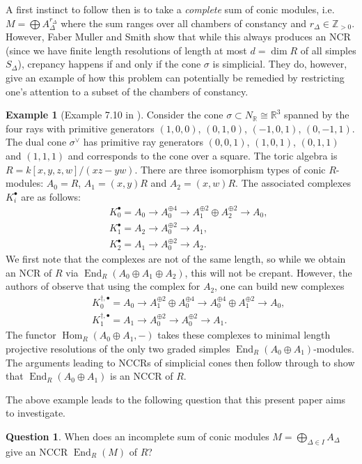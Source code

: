 \documentclass[reqno, 12pt]{amsart}
\theoremstyle{definition}
\newtheorem{example}[theorem]{Example}
\numberwithin{equation}{section}
\newtheorem{question}[theorem]{Question}
\newcommand{\Hom}{\operatorname{Hom}}
\newcommand{\Z}{\mathbb{Z}}
\newcommand{\R}{\mathbb{R}}
\newcommand{\End}{\operatorname{End}}
\begin{document}
A first instinct to follow then is to take a \textit{complete} sum of conic modules, i.e. $M=\bigoplus A_\Delta^{r_\Delta}$ where the sum ranges over all chambers of constancy and $r_\Delta\in \Z_{>0}$. However, Faber Muller and Smith show that while this always produces an NCR (since we have finite length resolutions of length at most $d=\dim R$ of all simples $S_\Delta$), crepancy happens if and only if the cone $\sigma$ is simplicial. They do, however, give an example of how this problem can potentially be remedied by restricting one's attention to a subset of the chambers of constancy.
\begin{example}[Example 7.10 in \cite{FMS19}]
\label{Exa:710FMS}
    Consider the cone $\sigma\subset N_\R\cong \R^3$ spanned by the four rays with primitive generators $(1,0,0)$, $(0,1,0)$, $(-1,0,1)$, $(0,-1,1)$. The dual cone $\sigma^\vee$ has primitive ray generators $(0,0,1)$, $(1,0,1)$, $(0,1,1)$ and $(1,1,1)$ and corresponds to the cone over a square. The toric algebra is $R=k[x,y,z,w]/(xz-yw)$. There are three isomorphism types of conic $R$-modules:
    $A_0=R$, $A_1=(x,y)R$ and $A_2=(x,w)R$. The associated complexes $K_i^\bullet$ are as follows:
    \begin{eqnarray*}
        && K_0^\bullet=A_0\rightarrow A_0^{\oplus 4}\rightarrow A_1^{\oplus 2}\oplus A_2^{\oplus 2}\rightarrow A_0,\\
        && K_1^\bullet=A_2\rightarrow A_0^{\oplus 2}\rightarrow A_1,\\
        && K_2^\bullet=A_1\rightarrow A_0^{\oplus 2}\rightarrow A_2.\;
    \end{eqnarray*}
    We first note that the complexes are not of the same length, so while we obtain an NCR of $R$ via $\End_R(A_0\oplus A_1\oplus A_2)$, this will not be crepant. However, the authors of \cite{FMS19} observe that using the complex for $A_2$, one can build new complexes \begin{eqnarray*}
        && K_0^{\dagger,\bullet}=A_0\rightarrow A_1^{\oplus 2}\oplus A_0^{\oplus 4}\rightarrow A_0^{\oplus 4}\oplus A_1^{\oplus 2}\rightarrow A_0,\\
        && K_1^{\dagger,\bullet}=A_1\rightarrow A_0^{\oplus 2}\rightarrow A_0^{\oplus 2}\rightarrow A_1.\;
    \end{eqnarray*}
    The functor $\Hom_R(A_0\oplus A_1,-)$ takes these complexes to minimal length projective resolutions of the only two graded simples $\End_R(A_0\oplus A_1)$-modules. The arguments leading to NCCRs of simplicial cones then follow through to show that $\End_R(A_0\oplus A_1)$ is an NCCR of $R$.
\end{example}
The above example leads to the following question that this present paper aims to investigate.
\begin{question}
\label{Qn:IncompleteConMod}
    When does an incomplete sum of conic modules $M=\bigoplus_{\Delta\in I}A_\Delta$ give an NCCR $\End_R(M)$ of $R$?
\end{question}
\end{document}
